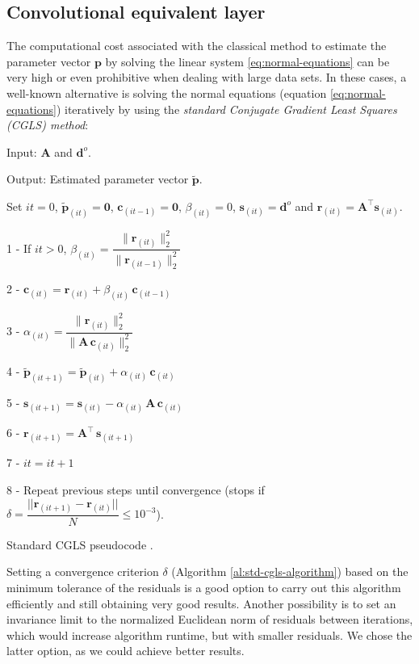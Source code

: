 \documentclass[manuscript,noblind]{geophysics}
\begin{document}
\subsection{Convolutional equivalent layer}

The computational cost associated with the classical method to estimate the parameter 
vector $\mathbf{p}$ by solving the linear system \ref{eq:normal-equations} can be very high 
or even prohibitive when dealing with large data sets. In these cases, a well-known alternative
is solving the normal equations (equation \ref{eq:normal-equations}) iteratively by 
using the \textit{standard Conjugate Gradient Least Squares (CGLS) method}:

\begin{algorithm}[H]
	Input: $\mathbf{A}$ and $\mathbf{d}^{o}$.
	
	Output: Estimated parameter vector $\tilde{\mathbf{p}}$.
	
	Set $it = 0$, $\tilde{\mathbf{p}}_{(it)} = \mathbf{0}$, $\mathbf{c}_{(it-1)} = \mathbf{0}$, $\beta_{(it)} = 0$, $\mathbf{s}_{(it)} = \mathbf{d}^{o}$ and $\mathbf{r}_{(it)} = \mathbf{A}^{\top} \mathbf{s}_{(it)}$.
	
	1 - If $it > 0$, $\beta_{(it)} = \dfrac{\| \mathbf{r}_{(it)} \|_{2}^{2}}{\| \mathbf{r}_{(it - 1)} \|_{2}^{2}}$
	
	2 - $\mathbf{c}_{(it)} = \mathbf{r}_{(it)} + \beta_{(it)} \, \mathbf{c}_{(it - 1)}$
	
	3 - $\alpha_{(it)} = \dfrac{{\| \mathbf{r}_{(it)}\|_{2}^{2}}}{\| \mathbf{A} \, \mathbf{c}_{(it)} \|_{2}^{2}}$
	
	4 - $\tilde{\mathbf{p}}_{(it + 1)} = \tilde{\mathbf{p}}_{(it)} + \alpha_{(it)} \, \mathbf{c}_{(it)}$
	
	5 - $\mathbf{s}_{(it + 1)} = \mathbf{s}_{(it)} - \alpha_{(it)} \, \mathbf{A} \, \mathbf{c}_{(it)}$
	
	6 - $\mathbf{r}_{(it + 1)} = \mathbf{A}^{\top} \, \mathbf{s}_{(it + 1)}$
	
	7 - $it = it + 1$
	
	8 - Repeat previous steps until convergence (stops if $\delta = \dfrac{||\mathbf{r}_{(it + 1)} - \mathbf{r}_{(it)}||}{N} \leq 10^{-3}$).
	
	\caption{Standard CGLS pseudocode \citep[][ p. 166]{aster2019parameter}.}
	\label{al:std-cgls-algorithm}
\end{algorithm}

Setting a convergence criterion $\delta$ (Algorithm \ref{al:std-cgls-algorithm}) based on the minimum tolerance 
of the residuals is a good option to carry out this algorithm efficiently and still obtaining very good results. 
Another possibility is to set an invariance limit to the normalized Euclidean norm of residuals between iterations,
which would increase algorithm runtime, but with smaller residuals. 
We chose the latter option, as we could achieve better results.
\end{document}
